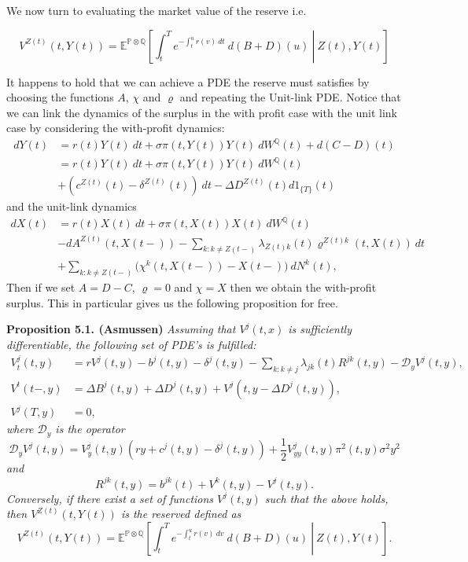 \documentclass[
]{book}
\begin{document}
We now turn to evaluating the market value of the reserve i.e.

\[
V^{Z(t)}(t,Y(t))=\mathbb E^{\mathbb P\otimes \mathbb Q}\left[\left.\int_t^Te^{-\int_t^u r(v)\ dt}\ d(B+D)(u)\ \right\vert\ Z(t),Y(t)\right]
\]

It happens to hold that we can achieve a PDE the reserve must satisfies by choosing the functions \(A\), \(\chi\) and \(\varrho\) and repeating the Unit-link PDE. Notice that we can link the dynamics of the surplus in the with profit case with the unit link case by considering the with-profit dynamics:
\begin{align*}
dY(t)&=r(t)Y(t)\ dt + \sigma\pi(t,Y(t)) Y(t)\ dW^\mathbb Q(t) + d(C-D)(t)\\
&=r(t)Y(t)\ dt + \sigma\pi(t,Y(t)) Y(t)\ dW^\mathbb Q(t)\\
&+(c^{Z(t)}(t)-\delta^{Z(t)}(t))\ dt-\Delta D^{Z(t)}(t)d1_{\{T\}}(t)
\end{align*}
and the unit-link dynamics
\begin{align*}
dX(t)&=r(t)X(t)\ dt + \sigma\pi(t,X(t)) X(t)\ dW^\mathbb Q(t)\\
&-dA^{Z(t)}(t,X(t-))-\sum_{k:k\ne Z(t-)}\lambda_{Z(t)k}(t)\varrho^{Z(t)k}(t,X(t))\ dt\\
&+\sum_{k:k\ne Z(t-)}\Big(\chi^k(t,X(t-))-X(t-)\Big)\ dN^k(t),
\end{align*}
Then if we set \(A=D-C\), \(\varrho=0\) and \(\chi = X\) then we obtain the with-profit surplus. This in particular gives us the following proposition for free.

\textbf{Proposition 5.1. (Asmussen)} \emph{Assuming that \(V^j(t,x)\) is sufficiently differentiable, the following set of PDE's is fulfilled:}
\begin{align*}
V_t^j(t,y)&=rV^j(t,y)-b^j(t,y)-\delta^j(t,y)-\sum_{k:k\ne j}\lambda_{jk}(t)R^{jk}(t,y)-\mathcal D_y V^j(t,y),\\
V^t(t-,y)&=\Delta B^j(t,y)+\Delta D^j(t,y)+V^j(t,y-\Delta D^j(t,y)),\\
V^j(T,y)&=0,
\end{align*}
\emph{where \(\mathcal D_y\) is the operator}
\[
\mathcal D_yV^j(t,y)=V_y^j(t,y)\left(ry+c^j(t,y)-\delta^j(t,y)\right)+\frac{1}{2}V^j_{yy}(t,y)\pi^2(t,y)\sigma^2y^2
\]
\emph{and}
\[
R^{jk}(t,y)=b^{jk}(t)+V^k(t,y)-V^j(t,y).
\]
\emph{Conversely, if there exist a set of functions \(V^j(t,y)\) such that the above holds, then \(V^{Z(t)}(t,Y(t))\) is the reserved defined as}
\[
V^{Z(t)}(t,Y(t))=\mathbb E^{\mathbb P\otimes\mathbb Q}\left[\left. \int_t^Te^{-\int_t^u r(v)\ dv}\ d(B+D)(u)\ \right\vert\ Z(t),Y(t)\right].
\]
\end{document}
